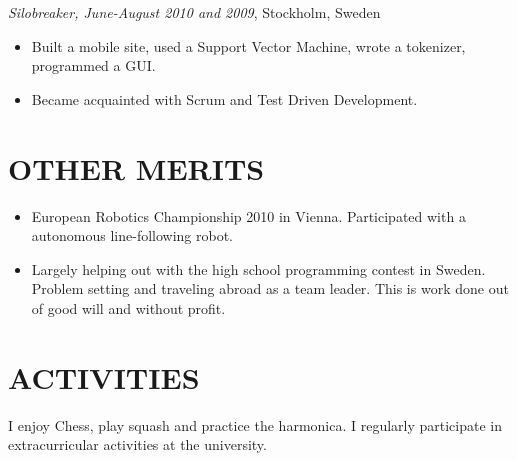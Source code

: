 \documentclass[11pt]{res} %
\begin{document}
\begin{resume}
\emph{Silobreaker, June-August 2010 and 2009}, Stockholm, Sweden
\vspace{0.2in}
 \begin{itemize} %
  \item Built a mobile site, used a Support Vector Machine, wrote a tokenizer,
   programmed a GUI.
  \item Became acquainted with Scrum and Test Driven Development.
\end{itemize} 

\section{OTHER MERITS}

   \begin{itemize} %
   \item European Robotics Championship 2010 in Vienna.
    Participated with a autonomous line-following robot.
   \item Largely helping out with the high school programming contest in Sweden.
    Problem setting and traveling abroad as a team leader.
    This is work done out of good will and without profit.
 \end{itemize}

\section{ACTIVITIES} 
 
I enjoy Chess, play squash and practice the harmonica.
I regularly participate in extracurricular
activities at the university.
 

\end{resume}
\end{document}
